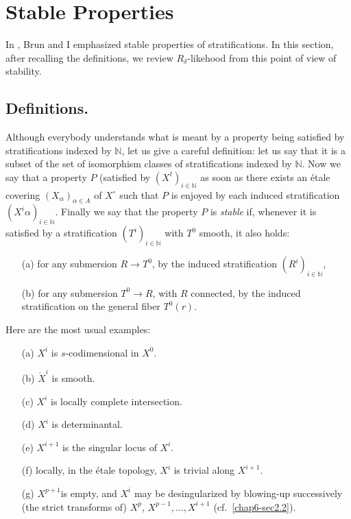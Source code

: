 \section{Stable Properties \texorpdfstring{\cite{chap6-BH2}}{Cite}}\label{chap6-sec4}

In \cite{chap6-BH2}, Brun and I emphasized stable properties of
stratifications. In this section, after recalling the definitions, we
review $R_{\delta}$-likehood from this point of view of stability.

\subsection{Definitions.}\label{chap6-sec4.1}

Although everybody understands what is meant by a property being
satisfied by stratifications indexed by $\mathbb{N}$, let us give a
careful definition: let us say that it is a subset of the set of
isomorphism classes of stratifications indexed by $\mathbb{N}$. Now we
say that a property $P$ (satisfied by $(X^{t})_{i\in \mathbb{N}}$ as
soon as there exists an \'etale covering $(X_{\alpha})_{\alpha\in A}$
of $X^{\circ}$ such that $P$ is enjoyed by each induced stratification
$(X^{i}\alpha)_{i\in \mathbb{N}}$. Finally we say that the property
$P$ is {\em stable} if, whenever it is satisfied by a stratification
$(T^{i})_{i\in \mathbb{N}}$ with $T^{0}$ smooth, it also holds: 
\begin{itemize}
\item[(a)] for any submersion $R\to T^{0}$, by the induced
stratification $(R^{i})_{i\in \mathbb{N}}$,

\item[(b)] for any submersion $T^{0}\to R$, with $R$ connected, by the
induced stratification on the general fiber $T^{0}(r)$.
\end{itemize}

\setcounter{examples}{1}
\begin{examples}
Here are the most usual examples:
\begin{itemize}
\item[(a)] $X^{i}$ is $s$-codimensional in $X^{0}$.

\item[(b)] $\ring{X}^{i}$ is smooth.

\item[(c)] $X^{i}$ is locally complete intersection.

\item[(d)] $X^{i}$ is determinantal.

\item[(e)] $X^{i+1}$ is the singular locus of $X^{i}$.

\item[(f)] locally, in the \'etale topology, $X^{i}$ is trivial along
$X^{i+1}$. 

\item[(g)] $X^{p+1}$\pageoriginale is empty, and $X^{i}$ may be
desingularized by blowing-up successively (the strict transforms of)
$X^{p}$, $X^{p-1},\ldots,X^{i+1}$ (cf.~\ref{chap6-sec2.2}).
\end{itemize}
\end{examples}

